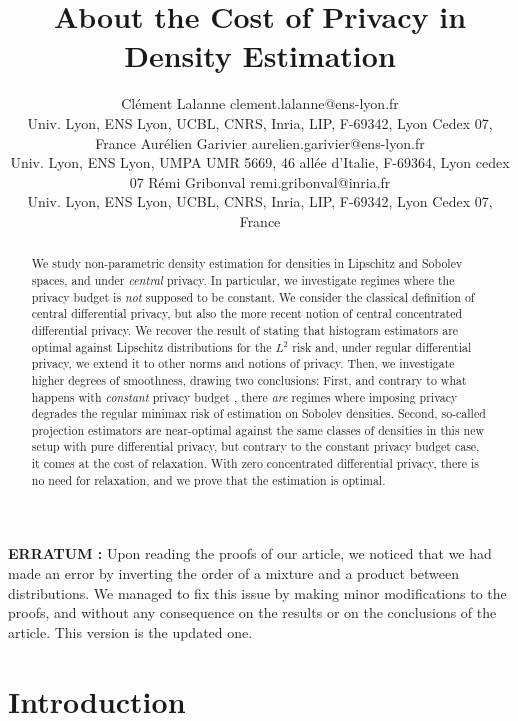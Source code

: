 \documentclass[10pt]{article} %
\title{About the Cost of \B{Central} Privacy in Density Estimation}
\author{{%
 \name Clément Lalanne \email clement.lalanne@ens-lyon.fr \\
 \addr Univ. Lyon, ENS Lyon, UCBL, CNRS, Inria,  LIP, F-69342, Lyon Cedex 07, France
 \AND
 \name Aurélien Garivier \email aurelien.garivier@ens-lyon.fr \\
 \addr Univ. Lyon, ENS Lyon, UMPA UMR 5669, 46 allée d'Italie, F-69364, Lyon cedex 07%
 \AND
 \name Rémi Gribonval \email remi.gribonval@inria.fr\\
 \addr Univ. Lyon, ENS Lyon, UCBL, CNRS, Inria,  LIP, F-69342, Lyon Cedex 07, France%
}}
\newcommand\CL[1]{\textcolor{blue}{#1}}
\newcommand\B[1]{{#1}}
\begin{document}
\maketitle

\begin{abstract}%
  We study non-parametric density estimation for densities in Lipschitz and Sobolev spaces, and under \emph{\B{central}} privacy. In particular, we investigate regimes where the privacy budget is \emph{not} supposed to be constant. We consider the classical definition of \B{central} differential privacy, but also the more recent notion of \B{central} concentrated differential privacy. We recover the result of \citet{barber2014privacy} stating that histogram estimators are optimal against Lipschitz distributions for the $L^2$ risk and, under regular differential privacy, we extend it to other norms and notions of privacy. Then, we investigate higher degrees of smoothness, drawing two conclusions: First, and contrary to what happens with \emph{constant} privacy budget \citep{wasserman2010statistical}, there \emph{are} regimes where imposing privacy degrades the regular minimax risk of estimation on Sobolev densities. Second, so-called projection estimators are near-optimal against the same classes of densities in this new setup with pure differential privacy, but contrary to the constant privacy budget case, it comes at the cost of relaxation. With zero concentrated differential privacy, there is no need for relaxation, and we prove that the estimation is optimal.
\end{abstract}


\textbf{ERRATUM : } Upon reading the proofs of our article, we noticed that we had made an error by inverting the order of a mixture and a product between distributions. We managed to fix this issue by making minor modifications to the proofs, and without any consequence on the results or on the conclusions of the article. This version is the updated one.

\section{Introduction}
\end{document}
